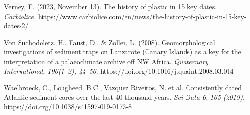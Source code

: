 \documentclass[twocolumn,a4paper,aps,amsmath,amssymb,floatfix,superscriptaddress]{revtex4-2}
\begin{document}
\begin{thebibliography}{99}
		 Verney, F. (2023, November 13). The history of plastic in 15 key dates. \textit{Carbiolice.} https://www.carbiolice.com/en/news/the-history-of-plastic-in-15-key-dates-2/
		
		 Von Suchodoletz, H., Faust, D., \& Zöller, L. (2008). Geomorphological investigations of sediment traps on Lanzarote (Canary Islands) as a key for the interpretation of a palaeoclimate archive off NW Africa. \textit{Quaternary International, 196(1–2), 44–56}. https://doi.org/10.1016/j.quaint.2008.03.014
		
		Waelbroeck, C., Lougheed, B.C., Vazquez Riveiros, N. et al. Consistently dated Atlantic sediment cores over the last 40 thousand years. \textit{Sci Data 6, 165 (2019)}. https://doi.org/10.1038/s41597-019-0173-8
	\end{thebibliography}
	
\end{document}
